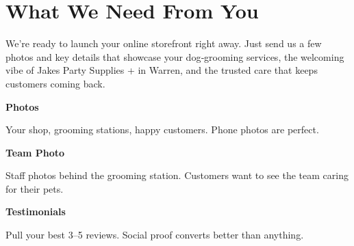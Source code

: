 \documentclass[11pt,letterpaper]{article}
\begin{document}
\vspace{0.2em}

\section*{What We Need From You}

We’re ready to launch your online storefront right away. Just send us a few photos and key details that showcase your dog‑grooming services, the welcoming vibe of Jakes Party Supplies + in Warren, and the trusted care that keeps customers coming back.

\vspace{0.12em}

\noindent\begin{minipage}[t]{0.48\textwidth}
\begin{tcolorbox}[colframe=accent-teal, boxrule=1pt, left=0.7em, right=0.7em, top=0.5em, bottom=0.5em, arc=4pt, boxsep=0pt]
{\bfseries\small\color{accent-teal}Photos}

\vspace{0.15em}

{\small Your shop, grooming stations, happy customers. Phone photos are perfect.}
\end{tcolorbox}

\vspace{0.1em}

\begin{tcolorbox}[colframe=accent-teal, boxrule=1pt, left=0.7em, right=0.7em, top=0.5em, bottom=0.5em, arc=4pt, boxsep=0pt]
{\bfseries\small\color{accent-teal}Team Photo}

\vspace{0.15em}

{\small Staff photos behind the grooming station. Customers want to see the team caring for their pets.}
\end{tcolorbox}

\vspace{0.1em}

\begin{tcolorbox}[colframe=accent-teal, boxrule=1pt, left=0.7em, right=0.7em, top=0.5em, bottom=0.5em, arc=4pt, boxsep=0pt]
{\bfseries\small\color{accent-teal}Testimonials}

\vspace{0.15em}

{\small Pull your best 3--5 reviews. Social proof converts better than anything.}
\end{tcolorbox}
\end{minipage}
\end{document}
